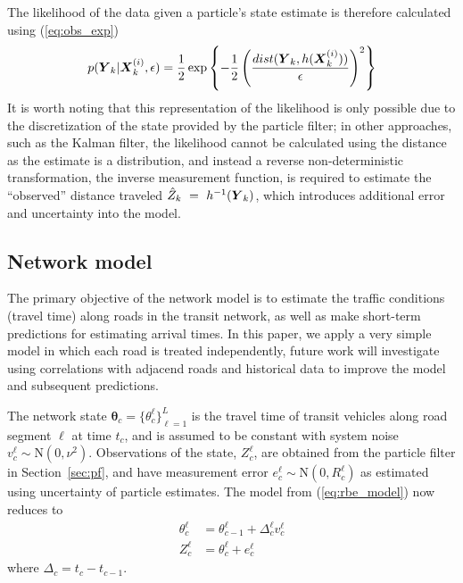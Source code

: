 The likelihood of the data given a particle's state estimate 
is therefore calculated using (\ref{eq:obs_exp})
\begin{equation}
p(\mbox{$\boldsymbol{Y}$}_k | \mbox{$\boldsymbol{X}$}_k^{(i)}, \epsilon) =
\frac{1}{2}\exp\left\{
-\frac{1}{2} \left(\frac{dist(\mbox{$\boldsymbol{Y}$}_k, h(\mbox{$\boldsymbol{X}$}_k^{(i)}))}{\epsilon}\right)^2
\right\}
\end{equation}
It is worth noting that this representation of the likelihood is only
possible due to the discretization of the state provided by the particle filter;
in other approaches, such as the Kalman filter,
the likelihood cannot be calculated using the distance as the estimate
is a distribution, and instead a reverse non-deterministic transformation,
the inverse measurement function,
is required to estimate the ``observed'' distance traveled $\hat Z_k~=~h^{-1}(\mbox{$\boldsymbol{Y}$}_k)$, 
which introduces additional error and uncertainty into the model.



\subsection{Network model}
\label{sec:kf}

The primary objective of the network model is to estimate the \rt traffic conditions
(travel time) along roads in the transit network, 
as well as make short-term predictions for estimating arrival times.
In this paper,  we apply a very simple model in which each road is treated independently,
future work will investigate using correlations with adjacend roads and historical data
to improve the model and subsequent predictions.


The network state $\boldsymbol\theta_c = \{\theta_c^\ell\}_{\ell = 1}^L$ is the travel time 
of transit vehicles along road segment $\ell$ at time $t_c$,
and is assumed to be constant with system noise $v_c^\ell \sim \mathrm{N}(0, \nu^2)$.
Observations of the state, $Z_c^\ell$, are obtained from the particle filter in Section~\ref{sec:pf},
and have measurement error $e_c^\ell \sim \mathrm{N}(0, R_c^\ell)$ as estimated 
using uncertainty of particle estimates.
The model from (\ref{eq:rbe_model}) now reduces to
\begin{equation}
\begin{split}
\theta_c^\ell &= \theta_{c-1}^\ell + \Delta_c^\ell v_c^\ell \\
Z_c^\ell &= \theta_c^\ell + e_c^\ell
\end{split}
\end{equation}
where $\Delta_c = t_c - t_{c-1}$.


